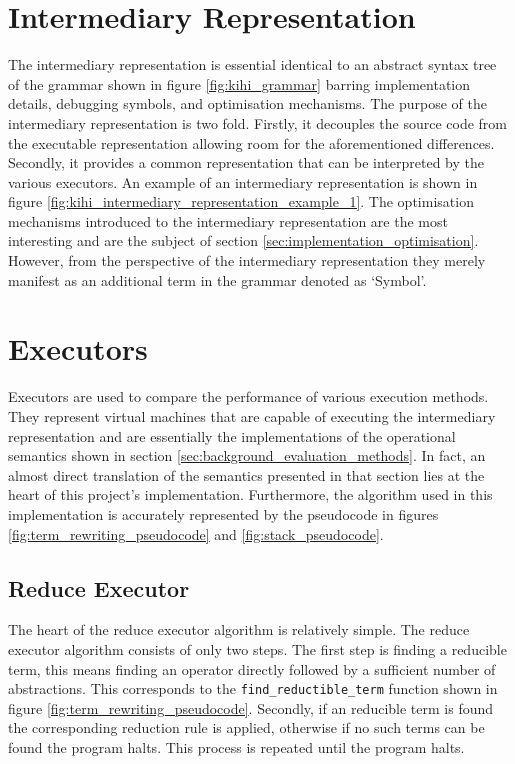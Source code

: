 
\section{Intermediary Representation}\label{sec:implementation_intermediary_representation}
The intermediary representation is essential identical to an abstract syntax tree of the grammar shown in figure \ref{fig:kihi_grammar} barring implementation details, debugging symbols, and optimisation mechanisms. The purpose of the intermediary representation is two fold. Firstly, it decouples the source code from the executable representation allowing room for the aforementioned differences. Secondly, it provides a common representation that can be interpreted by the various executors. An example of an intermediary representation is shown in figure \ref{fig:kihi_intermediary_representation_example_1}. The optimisation mechanisms introduced to the intermediary representation are the most interesting and are the subject of section \ref{sec:implementation_optimisation}. However, from the perspective of the intermediary representation they merely manifest as an additional term in the grammar denoted as `Symbol'.




\section{Executors}\label{sec:implementation_executors}
Executors are used to compare the performance of various execution methods. They represent virtual machines that are capable of executing the intermediary representation and are essentially the implementations of the operational semantics shown in section \ref{sec:background_evaluation_methods}. In fact, an almost direct translation of the semantics presented in that section lies at the heart of this project's implementation. Furthermore, the algorithm used in this implementation is accurately represented by the pseudocode in figures \ref{fig:term_rewriting_pseudocode} and \ref{fig:stack_pseudocode}.

\subsection{Reduce Executor}


The heart of the reduce executor algorithm is relatively simple. The reduce executor algorithm consists of only two steps. The first step is finding a reducible term, this means finding an operator directly followed by a sufficient number of abstractions. This corresponds to the \lstinline{find_reductible_term} function shown in figure \ref{fig:term_rewriting_pseudocode}. Secondly, if an reducible term is found the corresponding reduction rule is applied, otherwise if no such terms can be found the program halts. This process is repeated until the program halts.

